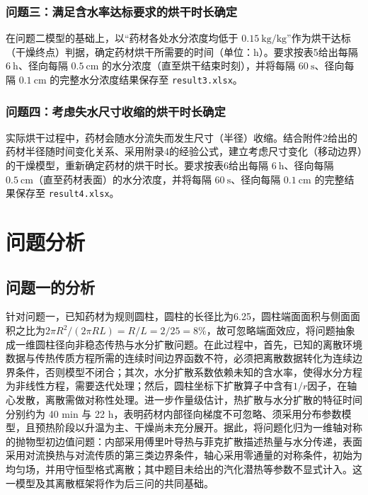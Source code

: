 \documentclass[12pt,a4paper]{article}
\begin{document}
\subsubsection{问题三：满足含水率达标要求的烘干时长确定}
在问题二模型的基础上，以“药材各处水分浓度均低于 $0.15\ \mathrm{kg/kg}$”作为烘干达标（干燥终点）判据，确定药材烘干所需要的时间（单位：$\mathrm{h}$）。要求按表5给出每隔 $6\ \mathrm{h}$、径向每隔 $0.5\ \mathrm{cm}$ 的水分浓度（直至烘干结束时刻），并将每隔 $60\ \mathrm{s}$、径向每隔 $0.1\ \mathrm{cm}$ 的完整水分浓度结果保存至 \texttt{result3.xlsx}。

\subsubsection{问题四：考虑失水尺寸收缩的烘干时长确定}
实际烘干过程中，药材会随水分流失而发生尺寸（半径）收缩。结合附件2给出的药材半径随时间变化关系、采用附录4的经验公式，建立考虑尺寸变化（移动边界）的干燥模型，重新确定药材的烘干时长。要求按表6给出每隔 $6\ \mathrm{h}$、径向每隔 $0.5\ \mathrm{cm}$（直至药材表面）的水分浓度，并将每隔 $60\ \mathrm{s}$、径向每隔 $0.1\ \mathrm{cm}$ 的完整结果保存至 \texttt{result4.xlsx}。


\section{问题分析}
\subsection{问题一的分析}
针对问题一，已知药材为规则圆柱，圆柱的长径比为6.25，圆柱端面面积与侧面面积之比为$2\pi R^2/(2\pi RL)=R/L=2/25=8\%$，故可忽略端面效应，将问题抽象成一维圆柱径向非稳态传热与水分扩散问题。在此过程中，首先，已知的离散环境数据与传热传质方程所需的连续时间边界函数不符，必须把离散数据转化为连续边界条件，否则模型不闭合；其次，水分扩散系数依赖未知的含水率，使得水分方程为非线性方程，需要迭代处理；然后，圆柱坐标下扩散算子中含有$1/r$因子，在轴心发散，离散需做对称性处理。进一步作量级估计，热扩散与水分扩散的特征时间分别约为 40 min 与 22 h，表明药材内部径向梯度不可忽略、须采用分布参数模型，且预热阶段以升温为主、干燥尚未充分展开。据此，将问题化归为一维轴对称的抛物型初边值问题：内部采用傅里叶导热与菲克扩散描述热量与水分传递，表面采用对流换热与对流传质的第三类边界条件，轴心采用零通量的对称条件，初始为均匀场，并用守恒型格式离散；其中题目未给出的汽化潜热等参数不显式计入。这一模型及其离散框架将作为后三问的共同基础。
\end{document}
